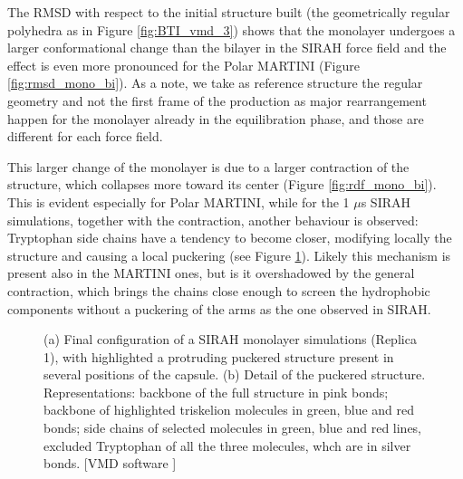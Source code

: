 The RMSD with respect to the initial structure built (the geometrically regular polyhedra as in Figure \ref{fig:BTI_vmd_3}) shows that the monolayer undergoes a larger conformational change than the bilayer in the SIRAH force field and the effect is even more pronounced for the Polar MARTINI (Figure \ref{fig:rmsd_mono_bi}). 
%
As a note, we take as reference structure the regular geometry and not the first frame of the production as major rearrangement happen for the monolayer already in the equilibration phase, and those are different for each force field.

This larger change of the monolayer is due to a larger contraction of the structure, which collapses more toward its center (Figure \ref{fig:rdf_mono_bi}).
%
This is evident especially for Polar MARTINI, while for the 1 $\mu$s SIRAH simulations, together with the contraction, another behaviour is observed: Tryptophan side chains have a tendency to become closer, modifying locally the structure and causing a local puckering (see Figure \ref{fig:sirah_mono_pic}). Likely this mechanism is present also in the MARTINI ones, but is it overshadowed by the general contraction, which brings the chains close enough to screen the hydrophobic components without a puckering of the arms as the one observed in SIRAH.
%
\begin{figure}[t!]
\centering
{}
\caption[Snapshot of SIRAH monolayer simulation]{(a) Final configuration of a SIRAH monolayer simulations (Replica 1), with highlighted a protruding puckered structure present in several positions of the capsule. (b) Detail of the puckered structure. Representations: backbone of the full structure in pink bonds; backbone of highlighted triskelion molecules in green, blue and red bonds; side chains of selected molecules in green, blue and red lines, excluded Tryptophan of all the three molecules, whch are in silver bonds. [VMD software \citet{HUMP96}]}
\label{fig:sirah_mono_pic}
\end{figure}

